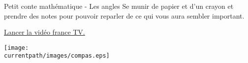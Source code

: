 
\vfill

\begin{center}
    \begin{myBox}{Petit conte mathématique - Les angles}
        Se munir de papier et d'un crayon et prendre des notes pour pouvoir reparler de ce qui vous aura sembler important.

        \bigskip
        
        \href{lozano.maths.free.fr/videos/LesAngles.mp4}{ Lancer la vidéo france TV.}
    \end{myBox}
\end{center}

\vfill

\begin{center}
    \texttt{[image: \\currentpath/images/compas.eps]}
\end{center}
